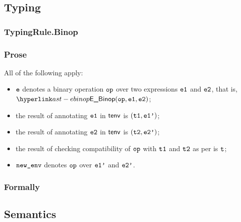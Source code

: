 \subsection{Typing}
\subsubsection{TypingRule.Binop\label{sec:TypingRule.Binop}}
\subsubsection{Prose}
All of the following apply:
\begin{itemize}
  \item $\ve$ denotes a binary operation $\op$ over two expressions $\veone$ and $\vetwo$, that is, \\ $\EBinop(\op, \veone, \vetwo)$;
  \item the result of annotating $\veone$ in $\tenv$ is $(\vtone, \veonep)$\ProseOrTypeError;
  \item the result of annotating $\vetwo$ in $\tenv$ is $(\vttwo, \vetwop)$\ProseOrTypeError;
  \item the result of checking compatibility of $\op$ with $\vtone$ and $\vttwo$ as per 
  is $\vt$\ProseOrTypeError;
  \item $\newenv$ denotes $\op$ over $\veonep$ and $\vetwop$.
\end{itemize}
\subsubsection{Formally}
\begin{mathpar}
\end{mathpar}

\subsection{Semantics}
